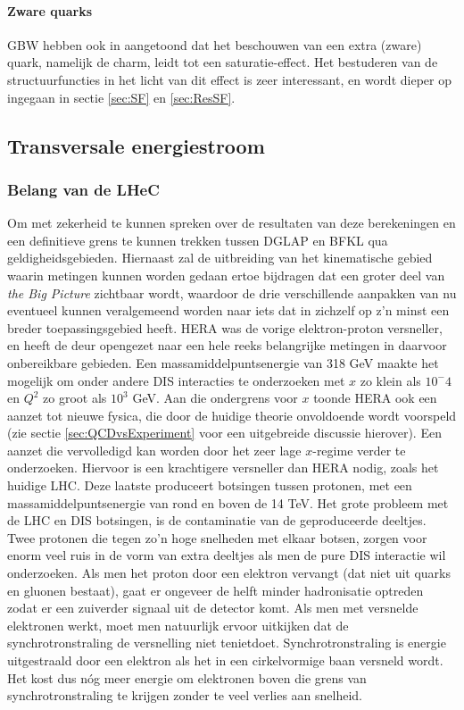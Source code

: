 \documentclass[a4paper,11pt]{article}
\numberwithin{equation}{section} %
\begin{document}
      \paragraph{Zware quarks}
GBW hebben ook in \cite{GBW} aangetoond dat het beschouwen van een extra (zware) quark, namelijk de charm, leidt tot een saturatie-effect.
Het bestuderen van de structuurfuncties in het licht van dit effect is zeer interessant, en wordt dieper op ingegaan in sectie \ref{sec:SF} en \ref{sec:ResSF}.

  \subsection{Transversale energiestroom}
    \subsubsection{Belang van de LHeC}
Om met zekerheid te kunnen spreken over de resultaten van deze berekeningen en een definitieve grens te kunnen trekken tussen DGLAP en BFKL qua geldigheidsgebieden.
Hiernaast zal de uitbreiding van het kinematische gebied waarin metingen kunnen worden gedaan ertoe bijdragen dat een groter deel van \textit{the Big Picture} zichtbaar wordt, waardoor de drie verschillende aanpakken van nu eventueel kunnen veralgemeend worden naar iets dat in zichzelf op z’n minst een breder toepassingsgebied heeft.
HERA was de vorige elektron-proton versneller, en heeft de deur opengezet naar een hele reeks belangrijke metingen in daarvoor onbereikbare gebieden.
Een massamiddelpuntsenergie van 318 GeV maakte het mogelijk om onder andere DIS  interacties te onderzoeken met $x$ zo klein als $10^-4$ en $Q^2$ zo groot als $10^3$ GeV.
Aan die ondergrens voor $x$ toonde HERA ook een aanzet tot nieuwe fysica, die door de huidige theorie onvoldoende wordt voorspeld (zie sectie \ref{sec:QCDvsExperiment} voor een uitgebreide discussie hierover).
Een aanzet die vervolledigd kan worden door het zeer lage $x$-regime verder te onderzoeken.
Hiervoor is een krachtigere versneller dan HERA nodig, zoals het huidige LHC.
Deze laatste produceert botsingen tussen protonen, met een massamiddelpuntsenergie van rond en boven de 14 TeV.
Het grote probleem met de LHC en DIS botsingen, is de contaminatie van de geproduceerde deeltjes.
Twee protonen die tegen zo’n hoge snelheden met elkaar botsen, zorgen voor enorm veel ruis in de vorm van extra deeltjes als men de pure DIS interactie wil onderzoeken.
Als men het proton door een elektron vervangt (dat niet uit quarks en gluonen bestaat), gaat er ongeveer de helft minder hadronisatie optreden zodat er een zuiverder signaal uit de detector komt.
Als men met versnelde elektronen werkt, moet men natuurlijk ervoor uitkijken dat de synchrotronstraling de versnelling niet tenietdoet.
Synchrotronstraling is energie uitgestraald door een elektron als het in een cirkelvormige baan versneld wordt.
Het kost dus nóg meer energie om elektronen boven die grens van synchrotronstraling te krijgen zonder te veel verlies aan snelheid.
\end{document}
